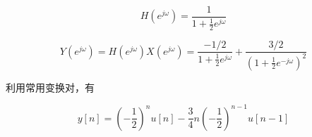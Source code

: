 \documentclass[11pt]{article}
\begin{document}
\[
H(e^{j\omega}) = \frac{1}{1+\frac{1}{2}e^{j\omega}}
\]

\[
Y(e^{j\omega}) = H(e^{j\omega})X(e^{j\omega}) = \frac{-1/2}{1 + \frac{1}{2}e^{j\omega}} + \frac{3/2}{(1 + \frac{1}{2}e^{-j\omega})^2}
\]

利用常用变换对，有

\[
y[n] = \left(-\frac{1}{2}\right)^nu[n] - \frac{3}{4}n\left(-\frac{1}{2}\right)^{n-1}u[n-1]
\]


    
    
    
\end{document}
